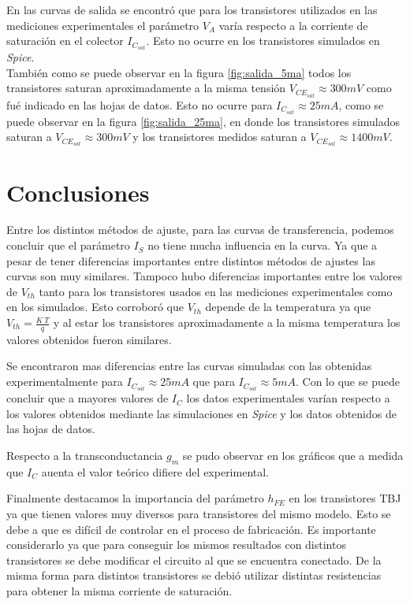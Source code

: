 \documentclass[10pt,spanish,a4paper,openany,notitlepage]{article}
\begin{document}
En las curvas de salida se encontró que para los transistores utilizados
en las mediciones experimentales el parámetro $V_A$ varía respecto a la
corriente de saturación en el colector $I_{C_{sat}}$. Esto no ocurre en
los transistores simulados en \emph{Spice}.\\
También como se puede observar en la figura \ref{fig:salida_5ma} todos
los transistores saturan aproximadamente a la misma tensión $V_{CE_{sat}} \approx 300\unit{mV}$
como fué indicado en las hojas de datos.
Esto no ocurre para $I_{C_{sat}} \approx 25 \unit{mA}$, como se puede observar
en la figura \ref{fig:salida_25ma}, en donde los transistores
simulados saturan a $V_{CE_{sat}} \approx 300\unit{mV}$ y los transistores
medidos saturan a $V_{CE_{sat}} \approx 1400\unit{mV}$.

\section{Conclusiones}

Entre los distintos métodos de ajuste, para las curvas de transferencia,
podemos concluir que el parámetro $I_S$ no tiene mucha influencia en la curva.
Ya que a pesar de tener diferencias importantes entre distintos métodos
de ajustes las curvas son muy similares.
Tampoco hubo diferencias importantes entre los valores de $V_{th}$ tanto 
para los transistores usados en las mediciones experimentales como en los 
simulados. Esto corroboró que $V_{th}$ depende de la temperatura ya que
$V_{th} = \frac{K\ T}{q}$ y al estar los transistores aproximadamente
a la misma temperatura los valores obtenidos fueron similares.

Se encontraron mas diferencias entre las curvas simuladas con las
obtenidas experimentalmente para $I_{C_{sat}} \approx 25 \unit{mA}$ que para
$I_{C_{sat}} \approx 5 \unit{mA}$. Con lo que se puede concluir que
a mayores valores de $I_{C}$ los datos experimentales varían respecto
a los valores obtenidos mediante las simulaciones en \emph{Spice} y los
datos obtenidos de las hojas de datos.

Respecto a la transconductancia $g_m$ se pudo observar en los gráficos
que a medida que $I_C$ auenta el valor teórico difiere del experimental.

Finalmente destacamos la importancia del parámetro $h_{FE}$ en los transistores
TBJ ya que tienen valores muy diversos para transistores del mismo modelo.
Esto se debe a que es difícil de controlar en el proceso de fabricación.
Es importante considerarlo ya que para  conseguir los mismos resultados con distintos transistores se debe modificar el circuito al que se encuentra conectado. De la misma
forma  para distintos transistores se debió utilizar distintas resistencias para obtener la misma corriente de saturación.
\end{document}
